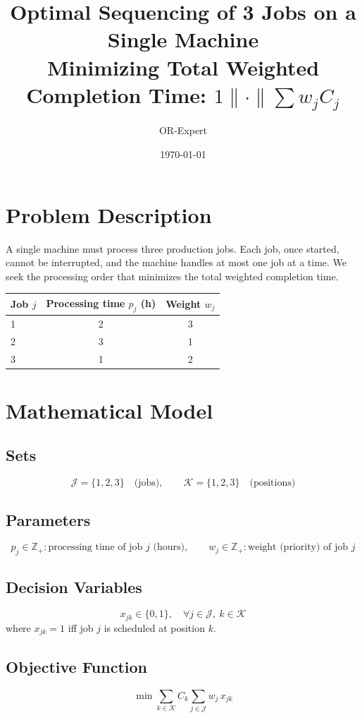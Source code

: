 \documentclass[11pt]{article}
\title{Optimal Sequencing of 3 Jobs on a Single Machine\\[4pt]
\large Minimizing Total Weighted Completion Time: $1 \| \cdot \| \sum w_j C_j$}
\author{OR-Expert}
\date{\today}
\begin{document}
\maketitle

\section{Problem Description}
A single machine must process three production jobs. Each job, once started,
cannot be interrupted, and the machine handles at most one job at a time.
We seek the processing order that minimizes the total weighted completion time.

\begin{center}
\begin{tabular}{lcc}
\hline
Job $j$ & Processing time $p_j$ (h) & Weight $w_j$ \\
\hline
1 & 2 & 3 \\
2 & 3 & 1 \\
3 & 1 & 2 \\
\hline
\end{tabular}
\end{center}

\section{Mathematical Model}

\subsection{Sets}
\[
\mathcal{J} = \{1, 2, 3\} \quad \text{(jobs)}, \qquad
\mathcal{K} = \{1, 2, 3\} \quad \text{(positions)}
\]

\subsection{Parameters}
\[
p_j \in \mathbb{Z}_+ : \text{processing time of job } j \text{ (hours)}, \qquad
w_j \in \mathbb{Z}_+ : \text{weight (priority) of job } j
\]

\subsection{Decision Variables}
\[
x_{jk} \in \{0, 1\}, \quad \forall j \in \mathcal{J},\ k \in \mathcal{K}
\]
where $x_{jk} = 1$ iff job $j$ is scheduled at position $k$.

\subsection{Objective Function}
\begin{equation}
\min \sum_{k \in \mathcal{K}} C_k \sum_{j \in \mathcal{J}} w_j \, x_{jk}
\label{eq:objective}
\end{equation}
\end{document}
